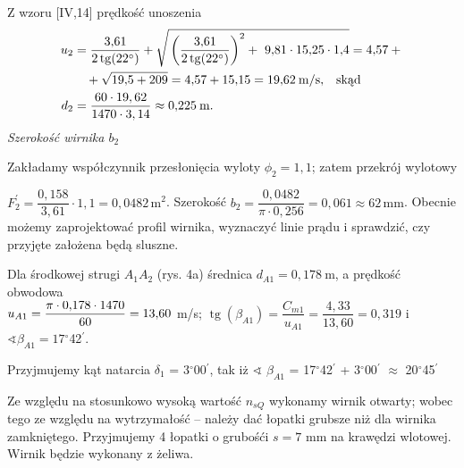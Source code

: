 \documentclass[a4paper]{book}
\DeclareMathOperator{\tg}{tg}
\begin{document}
\par Z wzoru [IV,14] prędkość unoszenia
\begin{align*}
%
u_2 &= \dfrac{3{,}61}{2\tg(22^{\circ})} + \sqrt{\strut \left(\dfrac{3{,}61}{2\tg(22^{\circ})}\right)^2 + \ 9{,}81 \cdot 15{,}25 \cdot 1{,}4} = 4{,}57 + {} \\ & \quad + \sqrt{\smash[b]{19{,}5 + 209}} = 4{,}57 + 15{,}15 = 19{,}62 \:  \mathrm{m/s,} \quad \text{skąd} \\
%		
%
 d_2 &= \dfrac{60\cdot19,62}{1470\cdot3,14} \approx 0{,}225 \: \text{m}. 
\end{align*}
%
\textit{Szerokość wirnika $b_2$}  
\par Zakładamy współczynnik przesłonięcia wyloty $\phi_2 = 1{,}1$; zatem przekrój	wylotowy 
\par $F_2^\prime = \dfrac{0{,}158}{3{,}61}\cdot1{,}1 = 0{,}0482 \, \mathrm{m^2}$. Szerokość $b_2 = \dfrac{0{,}0482}{\pi \cdot 0{,}256} = 0{,}061 \approx 62 \, \mathrm{mm}$.
	Obecnie możemy zaprojektować profil wirnika, wyznaczyć linie prądu i sprawdzić, czy przyjęte założena będą sluszne.

	Dla środkowej strugi $A_1A_2$ (rys. 4a) średnica $d_{A1} = 0,178 \: \text{m}$, a prędkość obwodowa \\
	$\smallskip u_{A1} = \dfrac{\pi \cdot 0{,}178 \cdot 1470}{60} = 13{,}60$ m/s; $\tg(\beta_{A1}) = \dfrac{C_{m1}}{u_{A1}} = \dfrac{4{,}33}{13{,}60} = 0,319$ i $\sphericalangle \beta_{A1} = 17$$^{\circ}$42$^\prime.$
	\newline \par Przyjmujemy kąt natarcia $\delta_1$ = 3$^{\circ}$00$^\prime$, tak iż $\sphericalangle$ $\beta_{A1}$ = 17$^{\circ}$42$^\prime$ + 3$^{\circ}$00$^\prime$ $\approx$ 20$^{\circ}$45$^\prime$
\par Ze względu na stosunkowo wysoką wartość $n_{sQ}$ wykonamy wirnik otwarty; wobec tego ze 
względu na wytrzymałość -- należy dać łopatki grubsze niż dla wirnika zamkniętego. Przyjmujemy
4 łopatki o grubośći $s = 7$ mm na krawędzi wlotowej. Wirnik będzie wykonany z żeliwa.
\end{document}
